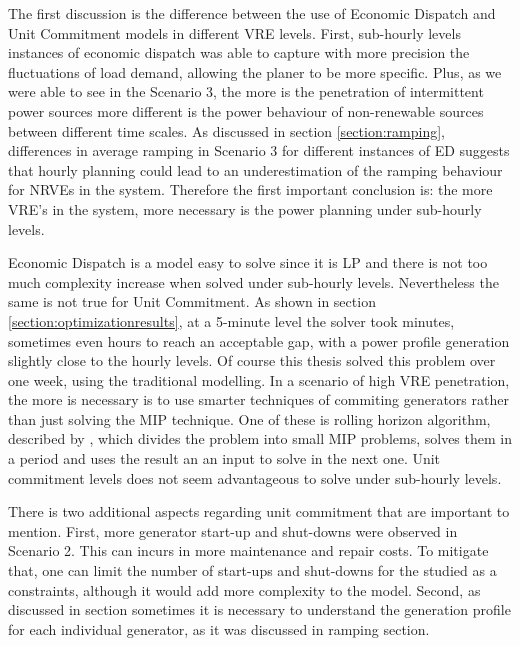\documentclass[12pt,LUDisStyle,twosided]{book}
\begin{document}
The first discussion is the difference between the use of Economic Dispatch and Unit Commitment models in different VRE levels. First, sub-hourly levels instances of economic dispatch was able to capture with more precision the fluctuations of load demand, allowing the planer to be more specific. Plus, as we were able to see in the Scenario 3, the more is the penetration of intermittent power sources more different is the power behaviour of non-renewable sources between different time scales. As discussed in section \ref{section:ramping}, differences in average ramping in Scenario 3 for different instances of ED suggests that hourly planning could lead to an underestimation of the ramping behaviour for NRVEs in the system. Therefore the first important conclusion is: the more VRE's in the system, more necessary is the power planning under sub-hourly levels.

Economic Dispatch is a model easy to solve since it is LP and there is not too much complexity increase when solved under sub-hourly levels. Nevertheless the same is not true for Unit Commitment. As shown in section \ref{section:optimizationresults}, at a 5-minute level the solver took minutes, sometimes even hours to reach an acceptable gap, with a power profile generation slightly close to the hourly levels. Of course this thesis solved this problem over one week, using the traditional modelling. In a scenario of high VRE penetration, the more is necessary is to use smarter techniques of commiting generators rather than just solving the MIP technique. One of these is rolling horizon algorithm, described by \citeauthor{tuohy} \cite{tuohy}, which divides the problem into small MIP problems, solves them in a period and uses the result an an input to solve in the next one. Unit commitment levels does not seem advantageous to solve under sub-hourly levels. 

There is two additional aspects regarding unit commitment that are important to mention. First, more generator start-up and shut-downs were observed in Scenario 2. This can incurs in more maintenance and repair costs. To mitigate that, one can limit the number of start-ups and shut-downs for the studied as a constraints, although it would add more complexity to the model. Second, as discussed in section sometimes it is necessary to understand the generation profile for each individual generator, as it was discussed in ramping section.
\end{document}
